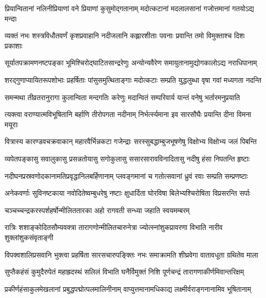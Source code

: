 \twolineshloka
{प्रियान्वितानां नलिनीप्रियाणां वने प्रियाणां कुसुमोद्गतानाम्}
{मदोत्कटानां मदलालसानां गजोत्तमानां गतयोऽद्य मन्दाः} %

\twolineshloka
{व्यक्तं नभः शस्त्रविधौतवर्णं कृशप्रवाहानि नदीजलानि}
{कह्लारशीताः पवनाः प्रवान्ति तमो विमुक्ताश्च दिशः प्रकाशाः} %

\twolineshloka
{सूर्यातपक्रामणनष्टपङ्का भूमिश्चिरोद्घाटितसान्द्ररेणुः}
{अन्योन्यवैरेण समायुतानामुद्योगकालोऽद्य नराधिपानाम्} %

\twolineshloka
{शरद्गुणाप्यायितरूपशोभाः प्रहर्षिताः पांसुसमुत्थिताङ्गाः}
{मदोत्कटाः सम्प्रति युद्धलुब्धा वृषा गवां मध्यगता नदन्ति} %

\twolineshloka
{समन्मथा तीव्रतरानुरागा कुलान्विता मन्दगतिः करेणुः}
{मदान्वितं सम्परिवार्य यान्तं वनेषु भर्तारमनुप्रयाति} %

\twolineshloka
{त्यक्त्वा वराण्यात्मविभूषितानि बर्हाणि तीरोपगता नदीनाम्}
{निर्भर्त्स्यमाना इव सारसौघैः प्रयान्ति दीना विमना मयूराः} %

\twolineshloka
{वित्रास्य कारण्डवचक्रवाकान् महारवैर्भिन्नकटा गजेन्द्राः}
{सरस्सुबद्धाम्बुजभूषणेषु विक्षोभ्य विक्षोभ्य जलं पिबन्ति} %

\twolineshloka
{व्यपेतपङ्कासु सवालुकासु प्रसन्नतोयासु सगोकुलासु}
{ससारसारावविनादितासु नदीषु हंसा निपतन्ति हृष्टाः} %

\twolineshloka
{नदीघनप्रस्रवणोदकानामतिप्रवृद्धानिलबर्हिणानाम्}
{प्लवङ्गमानां च गतोत्सवानां ध्रुवं रवाः सम्प्रति सम्प्रणष्टाः} %

\twolineshloka
{अनेकवर्णाः सुविनष्टकाया नवोदितेष्वम्बुधरेषु नष्टाः}
{क्षुधार्दिता घोरविषा बिलेभ्यश्चिरोषिता विप्रसरन्ति सर्पाः} %

\twolineshloka
{चञ्चच्चन्द्रकरस्पर्शहर्षोन्मीलिततारका}
{अहो रागवती सन्ध्या जहाति स्वयमम्बरम्} %

\twolineshloka
{रात्रिः शशाङ्कोदितसौम्यवक्त्रा तारागणोन्मीलितचारुनेत्रा}
{ज्योत्स्नांशुकप्रावरणा विभाति नारीव शुक्लांशुकसंवृताङ्गी} %

\twolineshloka
{विपक्वशालिप्रसवानि भुक्त्वा प्रहर्षिता सारसचारुपङ्क्तिः}
{नभः समाक्रामति शीघ्रवेगा वातावधूता ग्रथितेव माला} %

\twolineshloka
{सुप्तैकहंसं कुमुदैरुपेतं महाह्रदस्थं सलिलं विभाति}
{घनैर्विमुक्तं निशि पूर्णचन्द्रं तारागणाकीर्णमिवान्तरिक्षम्} %

\twolineshloka
{प्रकीर्णहंसाकुलमेखलानां प्रबुद्धपद्मोत्पलमालिनीनाम्}
{वाप्युत्तमानामधिकाद्य लक्ष्मीर्वराङ्गनानामिव भूषितानाम्} %

